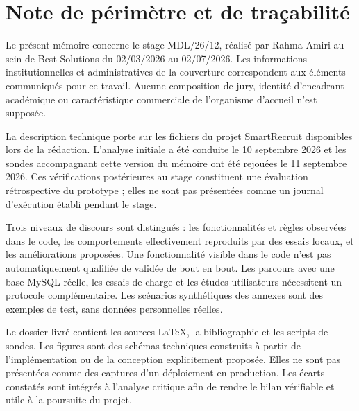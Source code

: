 \chapter*{Note de périmètre et de traçabilité}
Le présent mémoire concerne le stage MDL/26/12, réalisé par Rahma Amiri au sein de Best Solutions du 02/03/2026 au 02/07/2026. Les informations institutionnelles et administratives de la couverture correspondent aux éléments communiqués pour ce travail. Aucune composition de jury, identité d'encadrant académique ou caractéristique commerciale de l'organisme d'accueil n'est supposée.

La description technique porte sur les fichiers du projet SmartRecruit disponibles lors de la rédaction. L'analyse initiale a été conduite le 10 septembre 2026 et les sondes accompagnant cette version du mémoire ont été rejouées le 11 septembre 2026. Ces vérifications postérieures au stage constituent une évaluation rétrospective du prototype ; elles ne sont pas présentées comme un journal d'exécution établi pendant le stage.

Trois niveaux de discours sont distingués : les fonctionnalités et règles observées dans le code, les comportements effectivement reproduits par des essais locaux, et les améliorations proposées. Une fonctionnalité visible dans le code n'est pas automatiquement qualifiée de validée de bout en bout. Les parcours avec une base MySQL réelle, les essais de charge et les études utilisateurs nécessitent un protocole complémentaire. Les scénarios synthétiques des annexes sont des exemples de test, sans données personnelles réelles.

Le dossier livré contient les sources LaTeX, la bibliographie et les scripts de sondes. Les figures sont des schémas techniques construits à partir de l'implémentation ou de la conception explicitement proposée. Elles ne sont pas présentées comme des captures d'un déploiement en production. Les écarts constatés sont intégrés à l'analyse critique afin de rendre le bilan vérifiable et utile à la poursuite du projet.

\tableofcontents
\clearpage
{}
\listoffigures
\clearpage
{}
\listoftables

